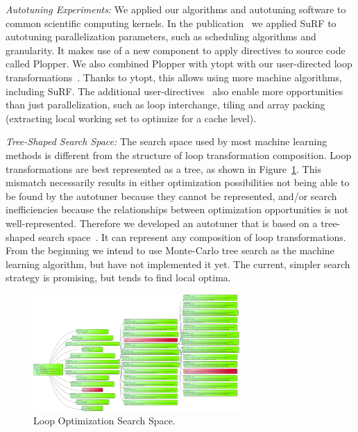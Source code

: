 \textit{Autotuning Experiments:} 
We applied our algorithms and autotuning software to common scientific computing kernels. In the publication~\cite{sreenivasan2019openmp} we applied SuRF to autotuning parallelization parameters, such as scheduling algorithms and granularity. It makes use of a new component to apply directives to source code called Plopper.
We also combined Plopper with ytopt with our user-directed loop transformations~\cite{wu2020autotuning}. Thanks to ytopt, this allows using more machine algorithms, including SuRF. The additional user-directives~\cite{kruse2018pragmas} also enable more opportunities than just parallelization, such as loop interchange, tiling and array packing (extracting local working set to optimize for a cache level).


\textit{Tree-Shaped Search Space:}
The search space used by most machine learning methods is different from the structure of loop transformation composition. Loop transformations are best represented as a tree, as shown in Figure~\ref{fig:YTune-mctree}. This mismatch necessarily results in either optimization possibilities not being able to be found by the autotuner because they cannot be represented, and/or search inefficiencies because the relationships between optimization opportunities is not well-represented.
Therefore we developed an autotuner that is based on a tree-shaped search space~\cite{kruse2020search}. It can represent any composition of loop transformations. From the beginning we intend to use Monte-Carlo tree search as the machine learning algorithm, but have not implemented it yet. The current, simpler search strategy is promising, but tends to find local optima.

\begin{figure}[h]                                                                                               
\begin{center}
\includegraphics[width=0.7\textwidth]{projects/2.3.2-Tools/2.3.2.10-PROTEAS-YTUNE/YTune-searchtree}
\end{center}
\caption{Loop Optimization Search Space.}\label{fig:YTune-mctree}                                                                                    
\end{figure}


